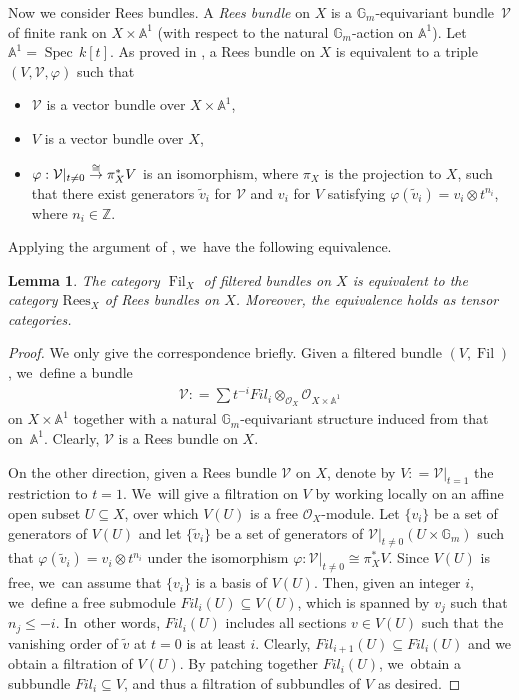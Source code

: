 \documentclass[JEP,XML,SOM,Unicode,published]{cedram}
\newcommand{\Fil}{\textit{Fil}}
\newcommand\To[1]{\mathchoice{\xrightarrow{\textstyle\kern4pt#1\kern3pt}}{\stackrel{#1}{\to}}{}{}}
\newcommand{\Rees}{\mathrm{Rees}}
\DeclareMathOperator{\Filt}{Fil}
\DeclareMathOperator{\Spec}{Spec}
\theoremstyle{plain}
\newtheorem{lem}[thm]{Lemma}
\theoremstyle{definition}
\begin{document}
Now we consider Rees bundles. A \emph{Rees bundle} on $X$ is a $\mathbb{G}_m$-equivariant bundle~$\mathcal{V}$ of finite rank on $X \times \mathbb{A}^1$ (with respect to the natural $\mathbb{G}_m$-action on $\mathbb{A}^1$). Let $\mathbb{A}^1 = \Spec \, k[t]$. As proved in \cite[Lem.\,2.1.3]{Lo17b}, a Rees bundle on $X$ is equivalent to a triple $(V,\mathcal{V},\varphi)$ such that
\begin{itemize}
\item $\mathcal{V}$ is a vector bundle over $X \times \mathbb{A}^1$,
\item $V$ is a vector bundle over $X$,
\item $\varphi: \mathcal{V}|_{t \neq 0} \To{\cong} \pi_X^* V$ is an isomorphism, where $\pi_X$ is the projection to $X$, such that there exist generators $\widetilde{v}_i$ for $\mathcal{V}$ and $v_i$ for $V$ satisfying $\varphi(\widetilde{v}_i) = v_i \otimes t^{n_i}$, where $n_i \in \mathbb{Z}$.
\end{itemize}
Applying the argument of \cite[Prop.\,2.1.5]{Lo17b}, we~have the following equivalence.

\begin{lem}\label{lem_rees_fil}
The category $\Filt_X$ of filtered bundles on $X$ is equivalent to the category $\Rees_X$ of Rees bundles on $X$. Moreover, the equivalence holds as tensor categories.
\end{lem}

\begin{proof}
We only give the correspondence briefly. Given a filtered bundle $(V, \Filt)$, we~define a bundle
\begin{align*}
\mathcal{V}: = \sum t^{-i} \Fil_{i} \otimes_{\mathcal{O}_X} \mathcal{O}_{X \times \mathbb{A}^1}
\end{align*}
on $X \times \mathbb{A}^1$ together with a natural $\mathbb{G}_m$-equivariant structure induced from that on~$\mathbb{A}^1$. Clearly, $\mathcal{V}$ is a Rees bundle on $X$.

On the other direction, given a Rees bundle $\mathcal{V}$ on $X$, denote by $V: = \mathcal{V}|_{t = 1}$ the restriction to $t=1$. We~will give a filtration on $V$ by working locally on an affine open subset $U \subseteq X$, over which $V(U)$ is a free $\mathcal{O}_X$-module. Let $\{v_i\}$ be a set of generators of $V(U)$ and let $\{\widetilde{v}_i\}$ be a set of generators of $\mathcal{V}|_{t \neq 0} (U \times \mathbb{G}_m)$ such that $\varphi(\widetilde{v}_i) = v_i \otimes t^{n_i}$ under the isomorphism $\varphi: \mathcal{V}|_{t \neq 0} \cong \pi^*_X V$. Since $V(U)$ is free, we~can assume that $\{v_i\}$ is a basis of $V(U)$. Then, given an integer $i$, we~define a free submodule $\Fil_i(U) \subseteq V(U)$, which is spanned by $v_j$ such that $n_j \leq -i$. In~other words, $\Fil_i(U)$ includes all sections $v \in V(U)$ such that the vanishing order of $\widetilde{v}$ at $t=0$ is at least $i$. Clearly, $\Fil_{i+1}(U) \subseteq \Fil_{i}(U)$ and we obtain a filtration of $V(U)$. By patching together $\Fil_i(U)$, we~obtain a subbundle $\Fil_i \subseteq V$, and thus a filtration of subbundles of $V$ as desired.
\end{proof}
\end{document}
